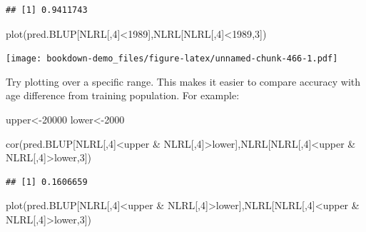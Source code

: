 \documentclass[
]{book}
\newenvironment{Shaded}{\begin{snugshade}}{\end{snugshade}}
\newcommand{\DecValTok}[1]{\textcolor[rgb]{0.00,0.00,0.81}{#1}}
\newcommand{\FunctionTok}[1]{\textcolor[rgb]{0.00,0.00,0.00}{#1}}
\newcommand{\NormalTok}[1]{#1}
\newcommand{\OtherTok}[1]{\textcolor[rgb]{0.56,0.35,0.01}{#1}}
\newcommand{\SpecialCharTok}[1]{\textcolor[rgb]{0.00,0.00,0.00}{#1}}
\begin{document}
\begin{verbatim}
## [1] 0.9411743
\end{verbatim}

\begin{Shaded}
\begin{Highlighting}[]
\FunctionTok{plot}\NormalTok{(pred.BLUP[NLRL[,}\DecValTok{4}\NormalTok{]}\SpecialCharTok{\textless{}}\DecValTok{1989}\NormalTok{],NLRL[NLRL[,}\DecValTok{4}\NormalTok{]}\SpecialCharTok{\textless{}}\DecValTok{1989}\NormalTok{,}\DecValTok{3}\NormalTok{])}
\end{Highlighting}
\end{Shaded}

\texttt{[image: bookdown-demo\_files/figure-latex/unnamed-chunk-466-1.pdf]}

Try plotting over a specific range. This makes it easier to compare accuracy with age
difference from training population. For example:

\begin{Shaded}
\begin{Highlighting}[]
\NormalTok{upper}\OtherTok{\textless{}{-}}\DecValTok{20000}
\NormalTok{lower}\OtherTok{\textless{}{-}}\DecValTok{2000}

\FunctionTok{cor}\NormalTok{(pred.BLUP[NLRL[,}\DecValTok{4}\NormalTok{]}\SpecialCharTok{\textless{}}\NormalTok{upper }\SpecialCharTok{\&}\NormalTok{ NLRL[,}\DecValTok{4}\NormalTok{]}\SpecialCharTok{\textgreater{}}\NormalTok{lower],NLRL[NLRL[,}\DecValTok{4}\NormalTok{]}\SpecialCharTok{\textless{}}\NormalTok{upper }\SpecialCharTok{\&}
\NormalTok{NLRL[,}\DecValTok{4}\NormalTok{]}\SpecialCharTok{\textgreater{}}\NormalTok{lower,}\DecValTok{3}\NormalTok{])}
\end{Highlighting}
\end{Shaded}

\begin{verbatim}
## [1] 0.1606659
\end{verbatim}

\begin{Shaded}
\begin{Highlighting}[]
\FunctionTok{plot}\NormalTok{(pred.BLUP[NLRL[,}\DecValTok{4}\NormalTok{]}\SpecialCharTok{\textless{}}\NormalTok{upper }\SpecialCharTok{\&}\NormalTok{ NLRL[,}\DecValTok{4}\NormalTok{]}\SpecialCharTok{\textgreater{}}\NormalTok{lower],NLRL[NLRL[,}\DecValTok{4}\NormalTok{]}\SpecialCharTok{\textless{}}\NormalTok{upper }\SpecialCharTok{\&}
\NormalTok{NLRL[,}\DecValTok{4}\NormalTok{]}\SpecialCharTok{\textgreater{}}\NormalTok{lower,}\DecValTok{3}\NormalTok{])}
\end{Highlighting}
\end{Shaded}
\end{document}
